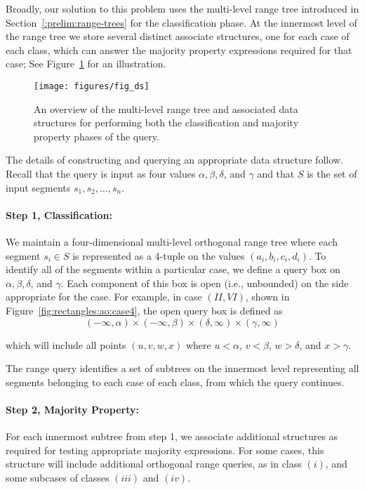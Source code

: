 Broadly, our solution to this problem uses the multi-level range tree introduced in Section~\ref{:prelim:range-trees} for the classification phase. At the innermost level of the range tree we store several distinct associate structures, one for each case of each class, which can answer the majority property expressions required for that case; See Figure~\ref{fig:rectangles:ao:overview} for an illustration.

\begin{figure}[t]
\begin{center}
  \texttt{[image: figures/fig\_ds]}
  \caption[An overview of the multi-level range tree required for arbitrarily-oriented segments]{An overview of the multi-level range tree and associated data structures for performing both the classification and majority property phases of the query.}
  \label{fig:rectangles:ao:overview}
\end{center}
\end{figure}

The details of constructing and querying an appropriate data structure follow. Recall that the query is input as four values $\alpha, \beta, \delta$, and $\gamma$ and that $S$ is the set of input segments $s_1, s_2, \ldots, s_n$.

\paragraph{Step 1, Classification:} We maintain a four-dimensional multi-level orthogonal range tree where each segment $s_i \in S$ is represented as a 4-tuple on the values $(a_i, b_i, c_i, d_i)$. To identify all of the segments within a particular case, we define a query box on $\alpha, \beta, \delta$, and $\gamma$. Each component of this box is open (i.e., unbounded) on the side appropriate for the case. For example, in case $(II, VI)$, shown in Figure~\ref{fig:rectangles:ao:case4}, the open query box is defined as
\[
(-\infty, \alpha) \times (-\infty, \beta) \times (\delta, \infty) \times (\gamma, \infty)
\]

\noindent which will include all points $(u, v, w, x)$ where $u < \alpha$, $v < \beta$, $w > \delta$, and $x > \gamma$.

The range query identifies a set of subtrees on the innermost level representing all segments belonging to each case of each class, from which the query continues.

\paragraph{Step 2, Majority Property:} For each innermost subtree from step 1, we associate additional structures as required for testing appropriate majority expressions. For some cases, this structure will include additional orthogonal range queries, as in class $(i)$, and some subcases of classes $(iii)$ and $(iv)$.

